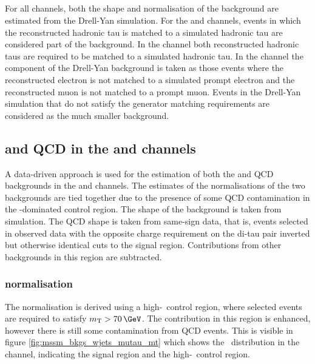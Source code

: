 \subsection{\texorpdfstring{\Ztautau}{Z to tau tau}}
\label{sec:mssm_bkgs_ztt}
For all channels, both the shape and normalisation of the \Ztautau background 
are estimated from the Drell-Yan
simulation.
For the \mutau and \etau channels, events
in which the reconstructed hadronic tau is matched to 
a simulated hadronic tau are considered part of the \Ztautau
background. In the \tautau channel both reconstructed
hadronic taus are required to be matched to a simulated hadronic tau. 
In the \emu channel the \Ztautau component of the Drell-Yan background 
is taken as those events where the reconstructed electron is not matched to
a simulated prompt electron and the reconstructed
muon is not matched to a prompt muon. 
Events in the Drell-Yan simulation 
that do not satisfy the generator matching requirements are considered
as the much smaller \Zellell background.

\clearpage

\subsection{\texorpdfstring{\Wjets and QCD in the \etau and \mutau channels}{W+jets and QCD in the e tau and mu tau channels}}
\label{sec:mssm_bkgs_mtet_wjetsqcd}
A data-driven approach is used for the estimation of
both the \Wjets and QCD backgrounds in the \etau and \mutau channels. 
The estimates of the normalisations of the two backgrounds are tied
together due to the presence of some QCD contamination in the \Wjets-dominated
control region. The shape of the \Wjets background is taken
from simulation. The QCD shape is taken from same-sign
data, that is, events selected in observed data with the opposite charge requirement
on the di-tau pair inverted but otherwise identical cuts to the signal region. Contributions
from other backgrounds in this region are subtracted.

\subsubsection{\texorpdfstring{\Wjets normalisation}{W+jets normalisation}}
\label{sec:mssm_bkgs_mtet_wjetsnorm}
The \Wjets normalisation is derived using a high-\mT~control region, where
selected events are required to satisfy $\mTm>70\,\GeV$. The 
\Wjets
contribution in this region is enhanced, however there is still
some contamination from QCD events. This is visible in 
figure \ref{fig:mssm_bkgs_wjets_mutau_mt} which shows the \mT~distribution in the
\mutau channel, indicating the signal region and the high-\mT~control region. 

